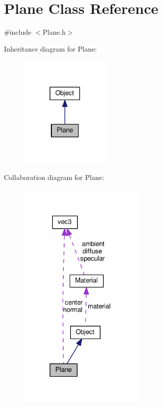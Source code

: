 \hypertarget{classPlane}{}\section{Plane Class Reference}
\label{classPlane}


{\ttfamily \#include $<$Plane.\+h$>$}



Inheritance diagram for Plane\+:
\nopagebreak
\begin{figure}[H]
\begin{center}
\leavevmode
\includegraphics[width=125pt]{classPlane__inherit__graph}
\end{center}
\end{figure}


Collaboration diagram for Plane\+:
\nopagebreak
\begin{figure}[H]
\begin{center}
\leavevmode
\includegraphics[width=173pt]{classPlane__coll__graph}
\end{center}
\end{figure}
